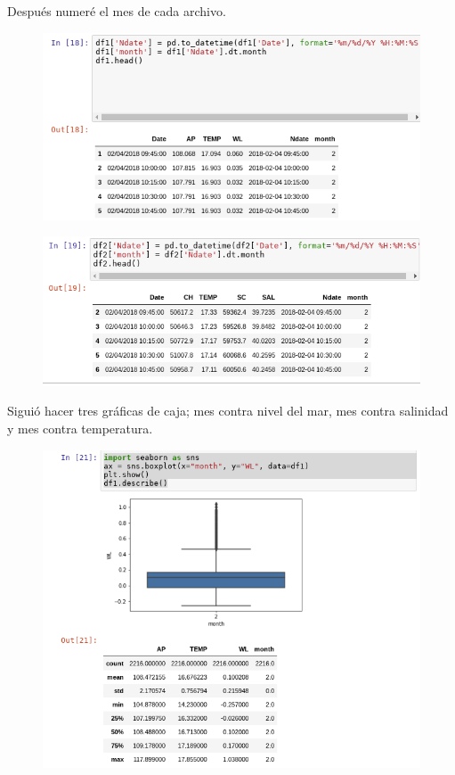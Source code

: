 \documentclass{article}
\begin{document}
Después numeré el mes de cada archivo.\\
\begin{figure}[H]
	\centering
    \includegraphics[width=\linewidth]{mes1.png}\\
\end{figure}
\begin{figure}[H]
	\centering
    \includegraphics[width=\linewidth]{mes2.png}\\
\end{figure}
Siguió hacer tres gráficas de caja; mes contra nivel del mar, mes contra salinidad y mes contra temperatura.\\
\begin{figure}[H]
	\centering
    \includegraphics[width=\linewidth]{caja1.png}\\
\end{figure}
\end{document}
